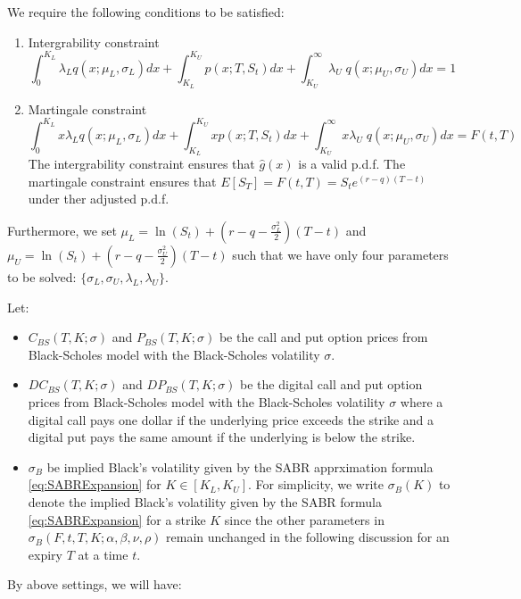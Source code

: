 \documentclass[letterpaper,12pt,titlepage,oneside,final]{book}
\numberwithin{equation}{section}
\theoremstyle{definition}
\begin{document}
We require the following conditions to be satisfied:
\begin{enumerate}
\item Intergrability constraint
\begin{equation}
\int_{0}^{K_{L}}	\lambda_{L}   q(x;\mu_{L},\sigma_{L}) dx+
\int_{K_{L}}^{K_{U}}	  p(x;T,S_t)  dx+
\int_{K_{U}}^{\infty}	 \lambda_{U} \;  q(x;\mu_{U},\sigma_{U}) dx=1 
\label{eq:AppRND1}
\end{equation}
\item Martingale  constraint
\begin{equation}
\int_{0}^{K_{L}}	 x \lambda_{L}   q(x;\mu_{L},\sigma_{L}) dx+
\int_{K_{L}}^{K_{U}}	  x p(x;T,S_t)  dx+
\int_{K_{U}}^{\infty}	 x \lambda_{U} \;  q(x;\mu_{U},\sigma_{U}) dx=F(t,T)
\label{eq:AppRND2}
\end{equation}
The intergrability constraint ensures that $\hat{g}(x)$ is a valid p.d.f. The martingale  constraint ensures that $E[S_T]=F(t,T)=S_{t}e^{(r-q)(T-t)}$ under ther adjusted p.d.f.
\end{enumerate}
Furthermore, we set $\mu_L=\ln(S_t)+(r-q-\frac{\sigma_L^2}{2})(T-t)$ and $\mu_U=\ln(S_t)+(r-q-\frac{\sigma_U^2}{2})(T-t)$ such that we have only four parameters to be solved: $\{\sigma_{L},\sigma_{U}, \lambda_{L}, \lambda_{U}\}$. 

Let:
\begin{itemize}
\item  $C_{BS}(T,K;\sigma)$ and $P_{BS}(T,K;\sigma)$ be the call and put option prices from Black-Scholes model with the Black-Scholes volatility $\sigma$.
\item  $DC_{BS}(T,K;\sigma)$ and $DP_{BS}(T,K;\sigma)$ be the digital call and put option prices from Black-Scholes model with the Black-Scholes  volatility $\sigma$  where a digital call pays one dollar if the underlying price exceeds the strike and a digital put pays the same amount  if the underlying is below the strike. 
\item  $\sigma_B$ be implied Black's volatility given by the SABR apprximation formula \eqref{eq:SABRExpansion} for $K \in [K_{L},K_{U}]$. For simplicity, we write $\sigma_{B}(K)$ to denote the implied Black's volatility given by the SABR formula \eqref{eq:SABRExpansion} for a strike $K$ since the other parameters in  $\sigma_{B}(F,t,T,K;\alpha,\beta,\nu,\rho)$ remain unchanged in the following discussion for an expiry $T$ at a time $t$.
 \end{itemize}

By above settings, we will have:
\end{document}
